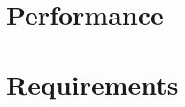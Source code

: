 \cleardoublepage
\label{chap:evaluation}

\section{Performance}\label{chap:evaluation:performance}

\section{Requirements}\label{chap:evaluation:requirements}
